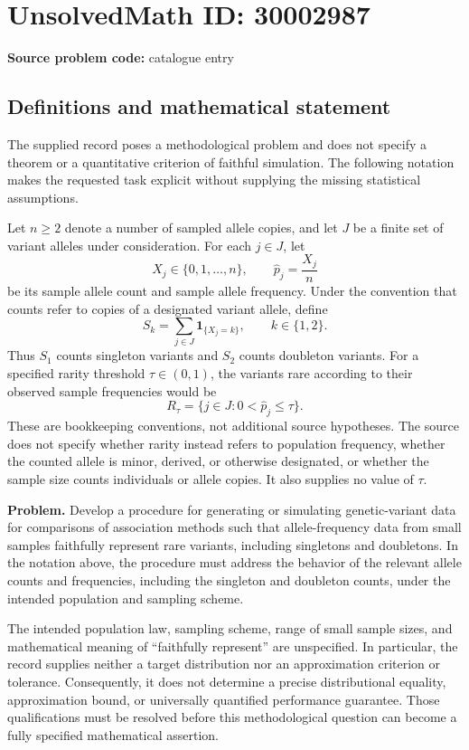 \documentclass[11pt]{article}
\begin{document}
\section*{UnsolvedMath ID: 30002987}
\textbf{Source problem code:} catalogue entry
\subsection{Definitions and mathematical statement}
The supplied record poses a methodological problem and does not specify a theorem or a quantitative criterion of faithful simulation. The following notation makes the requested task explicit without supplying the missing statistical assumptions.

Let \(n\geq 2\) denote a number of sampled allele copies, and let \(J\) be a finite set of variant alleles under consideration. For each \(j\in J\), let
\[
X_j\in\{0,1,\ldots,n\},\qquad \widehat p_j=\frac{X_j}{n}
\]
be its sample allele count and sample allele frequency. Under the convention that counts refer to copies of a designated variant allele, define
\[
S_k=\sum_{j\in J}\mathbf 1_{\{X_j=k\}},\qquad k\in\{1,2\}.
\]
Thus \(S_1\) counts singleton variants and \(S_2\) counts doubleton variants. For a specified rarity threshold \(\tau\in(0,1)\), the variants rare according to their observed sample frequencies would be
\[
R_\tau=\{j\in J:0<\widehat p_j\leq\tau\}.
\]
These are bookkeeping conventions, not additional source hypotheses. The source does not specify whether rarity instead refers to population frequency, whether the counted allele is minor, derived, or otherwise designated, or whether the sample size counts individuals or allele copies. It also supplies no value of \(\tau\).

\textbf{Problem.} Develop a procedure for generating or simulating genetic-variant data for comparisons of association methods such that allele-frequency data from small samples faithfully represent rare variants, including singletons and doubletons. In the notation above, the procedure must address the behavior of the relevant allele counts and frequencies, including the singleton and doubleton counts, under the intended population and sampling scheme.

The intended population law, sampling scheme, range of small sample sizes, and mathematical meaning of ``faithfully represent'' are unspecified. In particular, the record supplies neither a target distribution nor an approximation criterion or tolerance. Consequently, it does not determine a precise distributional equality, approximation bound, or universally quantified performance guarantee. Those qualifications must be resolved before this methodological question can become a fully specified mathematical assertion.
\end{document}
